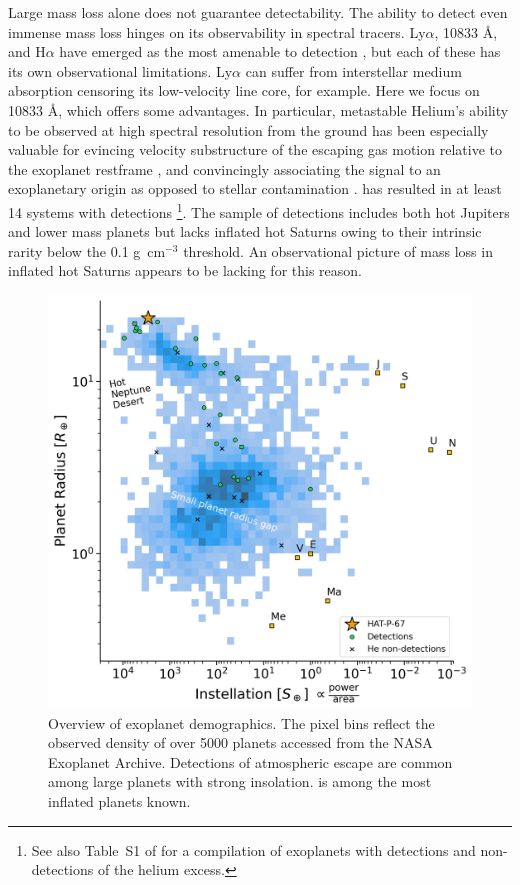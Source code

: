 \documentclass[linenumbers, twocolumn, trackchanges]{aastex631}
\newcommand{\hatpb}{\object{HAT-P-67 b}}
\begin{document}
Large mass loss alone does not guarantee detectability.  The ability to detect even immense mass loss hinges on its observability in spectral tracers.  Ly$\alpha$,  10833 \AA, and H$\alpha$ have emerged as the most amenable to detection \citep{2000ApJ...537..916S,2003Natur.422..143V,2012ApJ...751...86J,2018NatAs...2..714Y,2018ApJ...855L..11O,2018Natur.557...68S, 2022arXiv221116243D,2023MNRAS.518.4357O}, but each of these has its own observational limitations.  Ly$\alpha$ can suffer from interstellar medium  absorption censoring its low-velocity line core, for example.  Here we focus on  10833 \AA, which offers some advantages.  In particular, metastable Helium's ability to be observed at high spectral resolution from the ground has been especially valuable for evincing velocity substructure of the escaping gas motion relative to the exoplanet restframe \citep{2019A&A...629A.110A,2020ApJ...894...97N}, and convincingly associating the signal to an exoplanetary origin as opposed to stellar contamination \citep{2018AJ....156..189C}.   has resulted in at least 14 systems with detections \citep{2022arXiv221116243D}\footnote{See also Table~S1 of \citealt{doi:10.1126/sciadv.adf8736} for a compilation of exoplanets with detections and non-detections of the helium excess.}.  The sample of detections includes both hot Jupiters and lower mass planets but lacks inflated hot Saturns owing to their intrinsic rarity below the 0.1 g~cm$^{-3}$ threshold. An observational picture of mass loss in inflated hot Saturns appears to be lacking for this reason.

\begin{figure}
  \centering
  \includegraphics[width=\linewidth]{HAT-P-67b_radius_valley.png}
  \caption{Overview of exoplanet demographics.  The pixel bins reflect the observed density of over 5000 planets accessed from the NASA Exoplanet Archive. Detections of atmospheric escape are common among large planets with strong insolation.  \hatpb is among the most inflated planets known.}
  \label{fig:instellation}
\end{figure}
\end{document}

